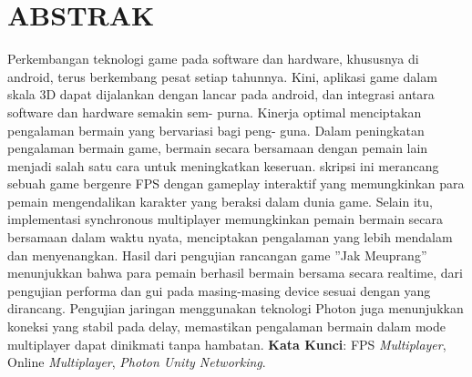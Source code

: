 \chapter*{ABSTRAK}
\noindent
Perkembangan teknologi game pada software dan hardware, khususnya di android, terus
berkembang pesat setiap tahunnya. Kini, aplikasi game dalam skala 3D dapat
dijalankan dengan lancar pada android, dan integrasi antara software dan hardware semakin sem-
purna. Kinerja optimal menciptakan pengalaman bermain yang bervariasi bagi peng-
guna. Dalam peningkatan pengalaman bermain game, bermain secara bersamaan
dengan pemain lain menjadi salah satu cara untuk meningkatkan keseruan. skripsi ini merancang sebuah game bergenre FPS dengan gameplay interaktif yang memungkinkan para pemain mengendalikan karakter yang beraksi dalam dunia game. Selain itu, implementasi synchronous multiplayer memungkinkan pemain bermain secara bersamaan dalam waktu nyata, menciptakan pengalaman yang lebih mendalam dan menyenangkan.
Hasil dari pengujian rancangan game ”Jak Meuprang” menunjukkan bahwa para
pemain berhasil bermain bersama secara realtime, dari pengujian performa dan gui pada masing-masing device sesuai dengan yang dirancang. Pengujian jaringan menggunakan
teknologi Photon juga menunjukkan koneksi yang stabil pada delay, memastikan pengalaman
bermain dalam mode multiplayer dapat dinikmati tanpa hambatan.
\newline
\noindent \textbf{Kata Kunci}: FPS \textit{Multiplayer}, Online \textit{Multiplayer}, \textit{Photon Unity Networking}.